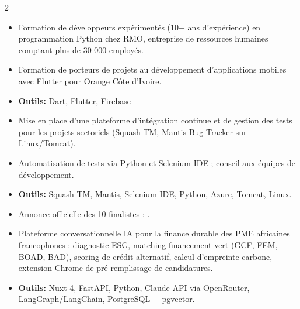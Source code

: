 \documentclass[10pt,a4paper,ragged2e,withhyper]{altacv}
\begin{document}
\begin{paracol}{2}
            \begin{itemize}
                \item Formation de développeurs expérimentés (10+ ans d'expérience) en programmation Python chez RMO, entreprise de ressources humaines comptant plus de 30 000 employés.
            \end{itemize}
            \divider
            
            \begin{itemize}
                \item Formation de porteurs de projets au développement d'applications mobiles avec Flutter pour Orange Côte d'Ivoire.
                \item \textcolor{SecondaryColor}{\textbf{Outils: }} Dart, Flutter, Firebase
            \end{itemize}

        \divider

        \begin{itemize}
            \item Mise en place d'une plateforme d'intégration continue et de gestion des tests pour les projets sectoriels (Squash-TM, Mantis Bug Tracker sur Linux/Tomcat).
            \item Automatisation de tests via Python et Selenium IDE ; conseil aux équipes de développement.
            \item \textcolor{SecondaryColor}{\textbf{Outils: }} Squash-TM, Mantis, Selenium IDE, Python, Azure, Tomcat, Linux.
        \end{itemize}

            \begin{itemize}
                \item Annonce officielle des 10 finalistes : .
                \item Plateforme conversationnelle IA pour la finance durable des PME africaines francophones : diagnostic ESG, matching financement vert (GCF, FEM, BOAD, BAD), scoring de crédit alternatif, calcul d'empreinte carbone, extension Chrome de pré-remplissage de candidatures.
                \item \textcolor{SecondaryColor}{\textbf{Outils: }} Nuxt 4, FastAPI, Python, Claude API via OpenRouter, LangGraph/LangChain, PostgreSQL + pgvector.
            \end{itemize}
            \divider


\end{paracol}
\end{document}
